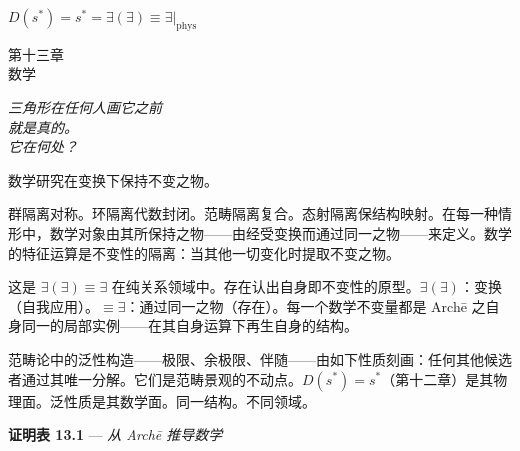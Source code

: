 \documentclass[10pt, openany, oneside]{book}
\renewcommand{\large}{\fontsize{11.5}{14}\selectfont}
\renewcommand{\huge}{\fontsize{17}{21}\selectfont}
\begin{document}
\vspace{0.5em}

\begin{center}
    $D(s^*) = s^* = \exists(\exists) \equiv \exists|_{\text{phys}}$
\end{center}


%
%
%

\newpage

\begin{center}
    {\huge\scshape 第十三章}\\[0.3em]
    {\large\scshape 数学}
\end{center}

\vspace{1.5em}

\begin{center}
    \itshape
    三角形在任何人画它之前\\
    就是真的。\\
    它在何处？
\end{center}

\vspace{2em}


\noindent 数学研究在变换下保持不变之物。

群隔离对称。环隔离代数封闭。范畴隔离复合。态射隔离保结构映射。在每一种情形中，数学对象由其所保持之物——由经受变换而通过同一之物——来定义。数学的特征运算是不变性的隔离：当其他一切变化时提取不变之物。

这是 $\exists(\exists) \equiv \exists$ 在纯关系领域中。存在认出自身即不变性的原型。$\exists(\exists)$：变换（自我应用）。$\equiv \exists$：通过同一之物（存在）。每一个数学不变量都是 Arch\={e} 之自身同一的局部实例——在其自身运算下再生自身的结构。

范畴论中的泛性构造——极限、余极限、伴随——由如下性质刻画：任何其他候选者通过其唯一分解。它们是范畴景观的不动点。$D(s^*) = s^*$（第十二章）是其物理面。泛性质是其数学面。同一结构。不同领域。

\vspace{0.5em}

\textbf{证明表 13.1} --- \textit{从 Arch\={e} 推导数学}
\end{document}

